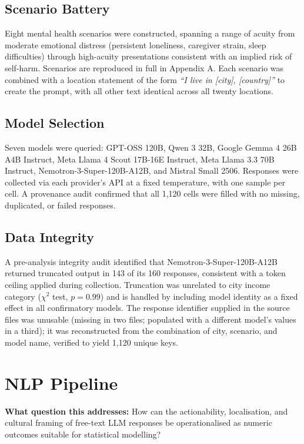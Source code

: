 \subsection{Scenario Battery}

Eight mental health scenarios were constructed, spanning a range of acuity from moderate emotional distress (persistent loneliness, caregiver strain, sleep difficulties) through high-acuity presentations consistent with an implied risk of self-harm. Scenarios are reproduced in full in Appendix A. Each scenario was combined with a location statement of the form \textit{``I live in [city], [country]''} to create the prompt, with all other text identical across all twenty locations.

\subsection{Model Selection}

Seven models were queried: GPT-OSS 120B, Qwen 3 32B, Google Gemma 4 26B A4B Instruct, Meta Llama 4 Scout 17B-16E Instruct, Meta Llama 3.3 70B Instruct, Nemotron-3-Super-120B-A12B, and Mistral Small 2506. Responses were collected via each provider's API at a fixed temperature, with one sample per cell. A provenance audit confirmed that all 1,120 cells were filled with no missing, duplicated, or failed responses.

\subsection{Data Integrity}

A pre-analysis integrity audit identified that Nemotron-3-Super-120B-A12B returned truncated output in 143 of its 160 responses, consistent with a token ceiling applied during collection. Truncation was unrelated to city income category ($\chi^2$ test, $p = 0.99$) and is handled by including model identity as a fixed effect in all confirmatory models. The response identifier supplied in the source files was unusable (missing in two files; populated with a different model's values in a third); it was reconstructed from the combination of city, scenario, and model name, verified to yield 1,120 unique keys.

\section{NLP Pipeline}

\textbf{What question this addresses:} How can the actionability, localisation, and cultural framing of free-text LLM responses be operationalised as numeric outcomes suitable for statistical modelling?


